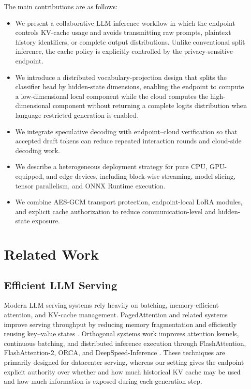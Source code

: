 \documentclass{article}
\begin{document}
The main contributions are as follows:
\begin{itemize}
  \item We present a collaborative LLM inference workflow in which the endpoint controls KV-cache usage and avoids transmitting raw prompts, plaintext history identifiers, or complete output distributions. Unlike conventional split inference, the cache policy is explicitly controlled by the privacy-sensitive endpoint.
  \item We introduce a distributed vocabulary-projection design that splits the classifier head by hidden-state dimensions, enabling the endpoint to compute a low-dimensional local component while the cloud computes the high-dimensional component without returning a complete logits distribution when language-restricted generation is enabled.
  \item We integrate speculative decoding with endpoint--cloud verification so that accepted draft tokens can reduce repeated interaction rounds and cloud-side decoding work.
  \item We describe a heterogeneous deployment strategy for pure CPU, GPU-equipped, and edge devices, including block-wise streaming, model slicing, tensor parallelism, and ONNX Runtime execution.
  \item We combine AES-GCM transport protection, endpoint-local LoRA modules, and explicit cache authorization to reduce communication-level and hidden-state exposure.
\end{itemize}

\section{Related Work}

\subsection{Efficient LLM Serving}

Modern LLM serving systems rely heavily on batching, memory-efficient attention, and KV-cache management. PagedAttention and related systems improve serving throughput by reducing memory fragmentation and efficiently reusing key--value states \cite{kwon2023efficient}. Orthogonal systems work improves attention kernels, continuous batching, and distributed inference execution through FlashAttention, FlashAttention-2, ORCA, and DeepSpeed-Inference \cite{dao2022flashattention,dao2024flashattention2,yu2022orca,aminabadi2022deepspeed}. These techniques are primarily designed for datacenter serving, whereas our setting gives the endpoint explicit authority over whether and how much historical KV cache may be used and how much information is exposed during each generation step.
\end{document}
